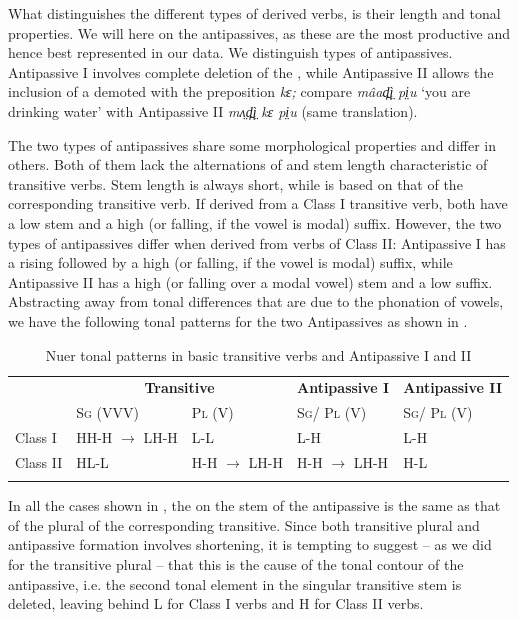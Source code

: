 \documentclass[output=paper
,newtxmath
,modfonts
,nonflat]{langsci/langscibook}
\begin{document}
What distinguishes the different types of derived verbs, is their length and tonal properties. We will  here on the antipassives, as these are the most productive and hence best represented in our data.  We distinguish types of antipassives.  Antipassive I involves complete deletion of the , while Antipassive II allows the inclusion of a demoted  with the preposition \textit{kɛ;} compare \textit{mâad̪ì̤} \textit{pi̤u} ‘you are drinking water’ with Antipassive II \textit{mʌ̤d̪ì̤} \textit{kɛ pi̤u} (same translation). 

The two types of antipassives share some morphological properties and differ in others.  Both of them lack the alternations of  and stem length characteristic of transitive verbs. Stem length is always short, while  is based on that of the corresponding transitive verb. If derived from a Class I transitive verb, both have a low  stem and a high  (or falling, if the vowel is modal) suffix. However, the two types of antipassives differ when derived from verbs of Class II: Antipassive I has a rising  followed by a high (or falling, if the vowel is modal) suffix, while Antipassive II has a high (or falling over a modal vowel) stem and a low suffix. Abstracting away from tonal differences that are due to the phonation of vowels, we have the following tonal patterns for the two Antipassives as shown in . 

\begin{table}
\begin{tabularx}{\textwidth}{llXXX} 
\lsptoprule
& \multicolumn{2}{c}{\bfseries Transitive} & \bfseries Antipassive I & \bfseries Antipassive II\\
& \textsc{Sg} (VVV) & \textsc{Pl} (V) & \textsc{Sg}/ \textsc{Pl} (V) & \textsc{Sg}/ \textsc{Pl} (V)\\
\midrule
Class I & HH-H $\rightarrow$ LH-H & L-L & L-H & L-H\\
Class II & HL-L & H-H $\rightarrow$ LH-H & H-H $\rightarrow$ LH-H & H-L\\
\lspbottomrule
\end{tabularx}
\caption{Nuer tonal patterns in basic transitive verbs and Antipassive I and II}
\label{tab:monich:13}
\end{table}

In all the cases shown in , the  on the stem of the antipassive is the same as that of the plural of the corresponding  transitive.  Since both transitive plural and antipassive formation involves shortening, it is tempting to suggest – as we did for the transitive plural – that this is the cause of the tonal contour of the antipassive, i.e. the second tonal element in the singular transitive stem is deleted, leaving behind L for Class I verbs and H for Class II verbs. 
\end{document}
